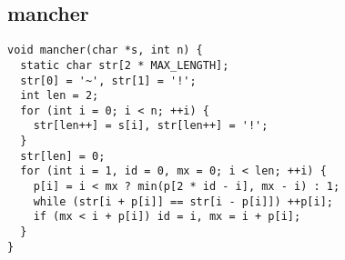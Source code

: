 \subsection{mancher}
\begin{lstlisting}
void mancher(char *s, int n) {
  static char str[2 * MAX_LENGTH];
  str[0] = '~', str[1] = '!';
  int len = 2;
  for (int i = 0; i < n; ++i) {
    str[len++] = s[i], str[len++] = '!';
  }
  str[len] = 0;
  for (int i = 1, id = 0, mx = 0; i < len; ++i) {
    p[i] = i < mx ? min(p[2 * id - i], mx - i) : 1;
    while (str[i + p[i]] == str[i - p[i]]) ++p[i];
    if (mx < i + p[i]) id = i, mx = i + p[i];
  }
}
\end{lstlisting}
